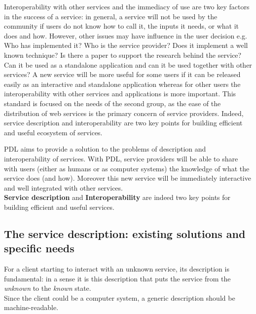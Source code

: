 \documentclass[a4paper,11pt] {ivoa}
\begin{document}
Interoperability with other services and the immediacy of use are two key factors in the success of a service:
in general, a service will not be used by the community if users do not know how to call it, the inputs it needs, or what it does and how. However, other issues may have influence in the user decision e.g. Who has implemented it? Who is the service provider? Does it implement a well known technique? Is there a paper to support the research behind the service? Can it be used as a standalone application and can it be used together with other services? 
A new service will be more useful for some users if it can be released easily as an interactive and standalone application whereas for other users the interoperability with other services and applications is more important. This standard is focused on the needs of the second group, as the ease of the distribution of web services is the primary concern of service providers.
Indeed, service description and interoperability are two key points for building efficient and useful ecosystem of services. 

PDL aims to provide a solution to the problems of description and interoperability of services. 
With PDL, service providers will be able to share with users (either as humans or as computer systems) 
the knowledge of what the service does (and how).
Moreover this new service will be immediately interactive and well integrated with other services.\\

{\bf Service description} and {\bf Interoperability} are indeed two key points for building
efficient and useful services.

\subsection{The service description: existing solutions and specific needs}
For a client starting to interact with an unknown service, its description is fundamental: in a
sense it is this description that puts the service from the {\it unknown} to the {\it known}
state.\\
Since the client could be a computer system, a generic description should be machine-readable.\\
\end{document}
